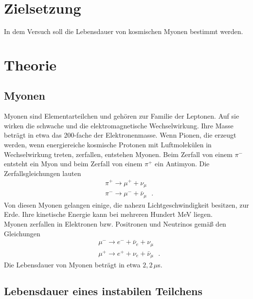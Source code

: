 



  \section{Zielsetzung}

    In dem Versuch soll die Lebensdauer von kosmischen Myonen bestimmt werden.


  \section{Theorie}

    \subsection{Myonen}

    Myonen sind Elementarteilchen und gehören zur Familie der Leptonen.
    Auf sie wirken die schwache und die elektromagnetische Wechselwirkung.
    Ihre Masse beträgt in etwa das 200-fache der Elektronenmasse.
    Wenn Pionen, die erzeugt werden, wenn energiereiche kosmische Protonen
    mit Luftmolekülen in Wechselwirkung treten, zerfallen, entstehen Myonen.
    Beim Zerfall von einem $\pi^-$ entsteht ein Myon und beim Zerfall von
    einem $\pi^+$ ein Antimyon. Die Zerfallsgleichungen lauten
    \begin{align*}
      &\pi^+ \to \mu^+ +\nu_{\mu}\\
      &\pi^- \to \mu^- +\bar{\nu}_{\mu}\,\,\,\,.
    \end{align*}
    Von diesen Myonen gelangen einige, die nahezu Lichtgeschwindigkeit
    besitzen, zur Erde. Ihre kinetische Energie kann bei mehreren Hundert MeV
    liegen. \\
    Myonen zerfallen in Elektronen bzw. Positronen und Neutrinos gemäß den Gleichungen
    \begin{align*}
      &\mu^- \to e^- +\bar{\nu}_e+\nu_{\mu}\\
      &\mu^+ \to e^+ +\nu_e +\bar{\nu}_{\mu}\,\,\,\,.
    \end{align*}
    Die Lebensdauer von Myonen beträgt in etwa $2,2\,\mu$s.

    \subsection{Lebensdauer eines instabilen Teilchens}

